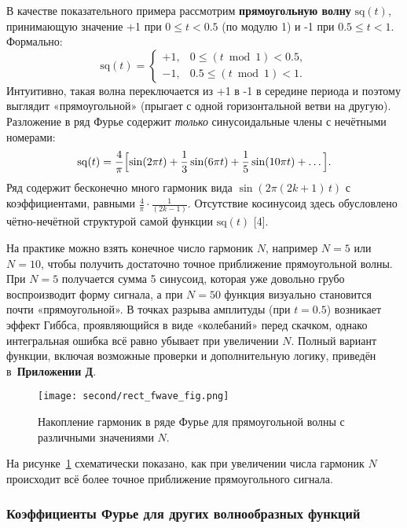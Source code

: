 \documentclass[bachelor, och, diploma]{SCWorks}
\begin{document}
В качестве показательного примера рассмотрим \textbf{прямоугольную волну} \( \mathrm{sq}(t)\), принимающую значение +1 при \(0 \le t < 0.5\) (по модулю 1) и -1 при \(0.5 \le t < 1\). Формально:
\[
\mathrm{sq}(t) = 
\begin{cases}
+1, & 0 \le (t \bmod 1) < 0.5,\\
-1, & 0.5 \le (t \bmod 1) < 1.
\end{cases}
\]
Интуитивно, такая волна переключается из +1 в -1 в середине периода и поэтому выглядит «прямоугольной» (прыгает с одной горизонтальной ветви на другую). Разложение в ряд Фурье содержит \textit{только} синусоидальные члены с нечётными номерами:
\[
\mathrm{sq}(t)
=
\frac{4}{\pi} 
\Bigl[\sin(2\pi t) + \frac{1}{3}\sin(6\pi t) + \frac{1}{5}\sin(10\pi t) + \dots\Bigr].
\]
Ряд содержит бесконечно много гармоник вида \(\sin(2\pi(2k+1)\,t)\) с коэффициентами, равными \(\tfrac{4}{\pi}\cdot \tfrac{1}{(2k-1)}\). Отсутствие косинусоид здесь обусловлено чётно-нечётной структурой самой функции \(\mathrm{sq}(t)\) [4]. 

На практике можно взять конечное число гармоник \(N\), например \(N=5\) или \(N=10\), чтобы получить достаточно точное приближение прямоугольной волны. При \(N=5\) получается сумма 5 синусоид, которая уже довольно грубо воспроизводит форму сигнала, а при \(N=50\) функция визуально становится почти «прямоугольной». В точках разрыва амплитуды (при \(t=0.5\)) возникает эффект Гиббса, проявляющийся в виде «колебаний» перед скачком, однако интегральная ошибка всё равно убывает при увеличении \(N\). Полный вариант функции, включая возможные проверки и дополнительную логику, приведён в~\textbf{Приложении Д}.

\begin{figure}[h!]
  \centering
  \texttt{[image: second/rect\_fwave\_fig.png]}
  \caption{Накопление гармоник в ряде Фурье для прямоугольной волны с различными значениями $N$.}
  \label{fig:rect_approx}
\end{figure}

На рисунке~\ref{fig:rect_approx} схематически показано, как при увеличении числа гармоник \(N\) происходит всё более точное приближение прямоугольного сигнала.

\subsubsection{Коэффициенты Фурье для других волнообразных функций}
\end{document}
